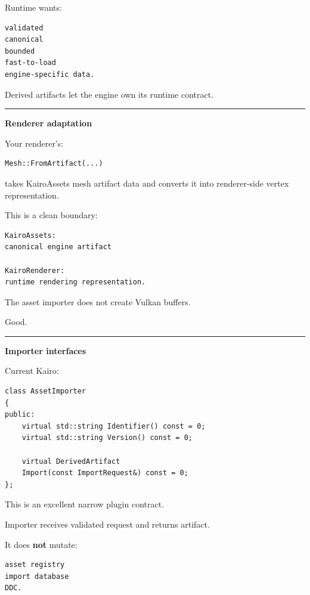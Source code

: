 Runtime wants:

\begin{verbatim}
validated
canonical
bounded
fast-to-load
engine-specific data.
\end{verbatim}

Derived artifacts let the engine own its runtime contract.

\begin{center}\rule{0.5\linewidth}{0.5pt}\end{center}

\textbf{Renderer adaptation}

Your renderer's:

\begin{verbatim}
Mesh::FromArtifact(...)
\end{verbatim}

takes KairoAssets mesh artifact data and converts it into renderer-side vertex representation.

This is a clean boundary:

\begin{verbatim}
KairoAssets:
canonical engine artifact

KairoRenderer:
runtime rendering representation.
\end{verbatim}

The asset importer does not create Vulkan buffers.

Good.

\begin{center}\rule{0.5\linewidth}{0.5pt}\end{center}

\textbf{Importer interfaces}

Current Kairo:

\begin{verbatim}
class AssetImporter
{
public:
    virtual std::string Identifier() const = 0;
    virtual std::string Version() const = 0;

    virtual DerivedArtifact
    Import(const ImportRequest&) const = 0;
};
\end{verbatim}

This is an excellent narrow plugin contract.

Importer receives validated request and returns artifact.

It does \textbf{not} mutate:

\begin{verbatim}
asset registry
import database
DDC.
\end{verbatim}

